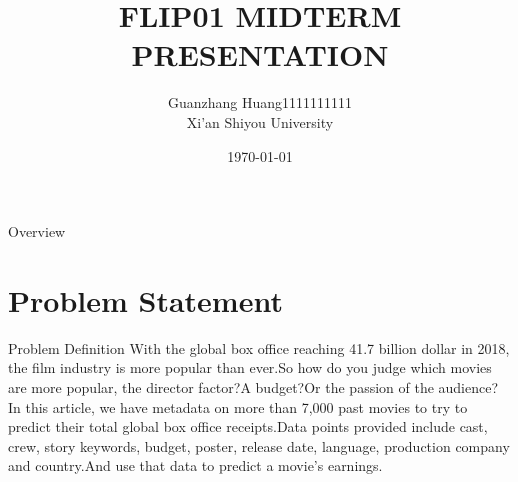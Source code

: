 \documentclass[
 size=12pt,
 paper=smartboard, %
 mode=present, %
 display=slides, %
style=tuliplab,
pauseslide,
fleqn,leqno]{powerdot}
\title{FLIP01 MIDTERM PRESENTATION}
\author{
Guanzhang Huang1111111111
\\
Xi'an Shiyou University 
}
\date{\today}
\begin{document}
\maketitle 
\begin{slide}[toc=,bm=]{Overview}
  \tableofcontents[content=sections]
\end{slide}

  \section{Problem Statement}

  \begin{slide}{Problem Definition}
 \hspace{0.5cm}  
 With the global box office reaching 41.7 billion dollar in 2018, the film industry is more popular than ever.So how do you judge which movies are more popular, the director factor?A budget?Or the passion of the audience?
 In this article, we have metadata on more than 7,000 past movies to try to predict their total global box office receipts.Data points provided include cast, crew, story keywords, budget, poster, release date, language, production company and country.And use that data to predict a movie's earnings.
  \end{slide}
\end{document}
